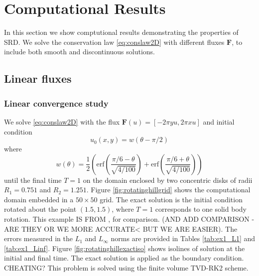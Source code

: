 \section{Computational Results}\label{sec:compResults}
In this section we show comptutional results demonstrating the properties of SRD.
We solve the conservation law \eqref{eq:conslaw2D} with different fluxes $\mathbf{F}$, to include both smooth and discontinuous
solutions.

\subsection{Linear fluxes}
\subsubsection{Linear convergence study}
We solve \eqref{eq:conslaw2D} with the flux $\mathbf{F}(u) = [-2\pi y u, 2\pi x u]$ and initial condition
$$
u_0(x,y) = w(\theta - \pi/2)
$$
where
$$
w(\theta) = \frac{1}{2}\left( \text{erf}\left( \frac{\pi/6 - \theta}{\sqrt{4/100}} \right) + \text{erf}\left( \frac{\pi/6 + \theta}{\sqrt{4/100}} \right)\right)
$$
until the final time $T = 1$ on the domain enclosed by two concentric disks of 
radii $R_1 = 0.751$ and $R_2 = 1.251$.  
Figure \ref{fig:rotatinghillgrid} shows the computational domain 
embedded in a $50 \times 50$ grid.  The exact solution is the initial condition 
rotated about the point $(1.5,1.5)$, where $T=1$ corresponds to one solid 
body rotation. This example IS FROM \cite{}, for comparison.  (AND ADD
COMPARISON - ARE THEY OR WE MORE ACCURATE< BUT WE ARE EASIER).   
The errors 
measured in the $L_1$ and $L_\infty$ norms are provided in 
Tables \ref{tab:ex1_L1} and \ref{tab:ex1_Linf}.  Figure
\ref{fig:rotatinghillexactiso} shows isolines of solution at the initial 
and final time.  The exact solution is applied as the boundary condition.
CHEATING?
This problem is solved using the finite volume TVD-RK2 scheme. 

